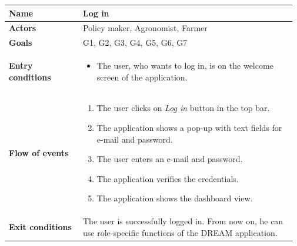 \begin{table}[H]
    \centering
	\begin{tabular}{@{}p{0.25\linewidth} p{0.72\linewidth}@{}}
\toprule
		\textbf{Name}               & Log in\\
		\midrule
		\textbf{Actors}             & Policy maker, Agronomist, Farmer\\
		\midrule
		\textbf{Goals}              & G1, G2, G3, G4, G5, G6, G7 \\
		\midrule
		
		\textbf{Entry conditions}   & \begin{itemize}[leftmargin=.4cm,noitemsep,topsep=0pt,before=\vspace{-3mm},after=\vspace{-4mm}]
		    \item The user, who wants to log in, is  on the welcome screen of the application.
		\end{itemize}\\
		\midrule
		
		\textbf{Flow of events}     & \begin{enumerate}[leftmargin=.4cm,noitemsep,topsep=0pt,before=\vspace{-3mm},after=\vspace{-4mm}]
		    \item The user clicks on \textit{Log in} button in the top bar.
		    \item The application shows a pop-up with text fields for e-mail and password.
		    \item The user enters an e-mail and password.
		    \item The application verifies the credentials.
		    \item The application shows the dashboard view.
		\end{enumerate}\\
		\midrule
		\textbf{Exit conditions}    & The user is successfully logged in. From now on, he can use role-specific functions of the DREAM application. \\
		\midrule
		

\end{tabular}
\end{table}

